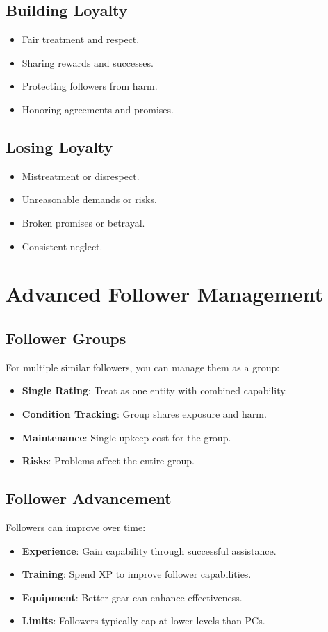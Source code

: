 \subsection*{Building Loyalty}
\begin{itemize}
\item Fair treatment and respect.
\item Sharing rewards and successes.
\item Protecting followers from harm.
\item Honoring agreements and promises.
\end{itemize}

\subsection*{Losing Loyalty}
\begin{itemize}
\item Mistreatment or disrespect.
\item Unreasonable demands or risks.
\item Broken promises or betrayal.
\item Consistent neglect.
\end{itemize}

\section{Advanced Follower Management}

\subsection*{Follower Groups}
For multiple similar followers, you can manage them as a group:
\begin{itemize}
\item \textbf{Single Rating}: Treat as one entity with combined capability.
\item \textbf{Condition Tracking}: Group shares exposure and harm.
\item \textbf{Maintenance}: Single upkeep cost for the group.
\item \textbf{Risks}: Problems affect the entire group.
\end{itemize}

\subsection*{Follower Advancement}
Followers can improve over time:
\begin{itemize}
\item \textbf{Experience}: Gain capability through successful assistance.
\item \textbf{Training}: Spend XP to improve follower capabilities.
\item \textbf{Equipment}: Better gear can enhance effectiveness.
\item \textbf{Limits}: Followers typically cap at lower levels than PCs.
\end{itemize}

